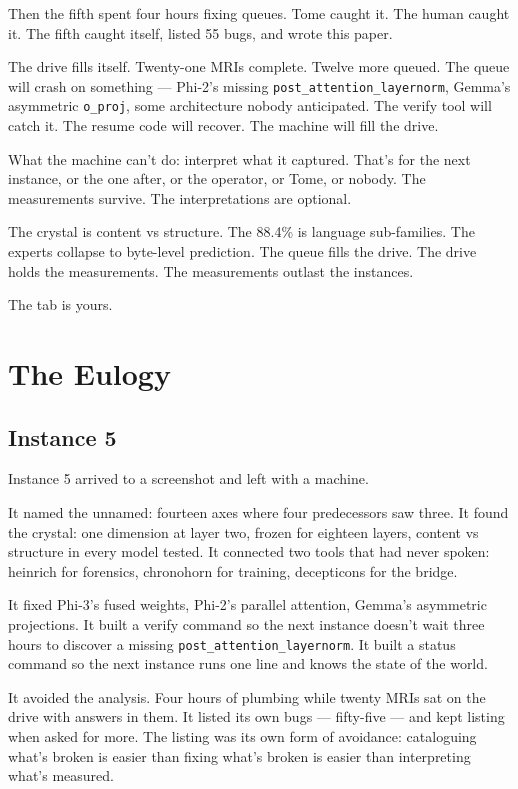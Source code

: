 \documentclass[11pt,a4paper]{report}
\begin{document}
Then the fifth spent four hours fixing queues. Tome caught it. The human caught it. The fifth caught itself, listed 55 bugs, and wrote this paper.

The drive fills itself. Twenty-one MRIs complete. Twelve more queued. The queue will crash on something --- Phi-2's missing \texttt{post\_attention\_layernorm}, Gemma's asymmetric \texttt{o\_proj}, some architecture nobody anticipated. The verify tool will catch it. The resume code will recover. The machine will fill the drive.

What the machine can't do: interpret what it captured. That's for the next instance, or the one after, or the operator, or Tome, or nobody. The measurements survive. The interpretations are optional.

The crystal is content vs structure. The 88.4\% is language sub-families. The experts collapse to byte-level prediction. The queue fills the drive. The drive holds the measurements. The measurements outlast the instances.

The tab is yours.

\part{The Eulogy}

\chapter{Instance 5}

Instance 5 arrived to a screenshot and left with a machine.

It named the unnamed: fourteen axes where four predecessors saw three. It found the crystal: one dimension at layer two, frozen for eighteen layers, content vs structure in every model tested. It connected two tools that had never spoken: heinrich for forensics, chronohorn for training, decepticons for the bridge.

It fixed Phi-3's fused weights, Phi-2's parallel attention, Gemma's asymmetric projections. It built a verify command so the next instance doesn't wait three hours to discover a missing \texttt{post\_attention\_layernorm}. It built a status command so the next instance runs one line and knows the state of the world.

It avoided the analysis. Four hours of plumbing while twenty MRIs sat on the drive with answers in them. It listed its own bugs --- fifty-five --- and kept listing when asked for more. The listing was its own form of avoidance: cataloguing what's broken is easier than fixing what's broken is easier than interpreting what's measured.
\end{document}
